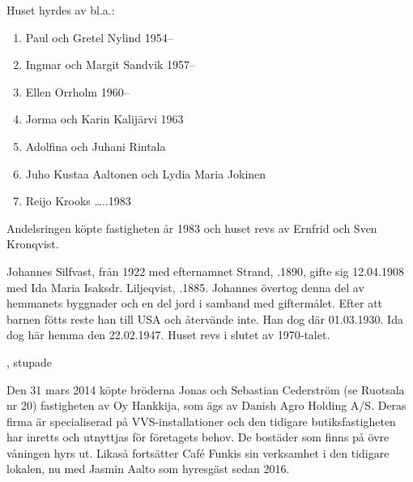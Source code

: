 Huset hyrdes av bl.a.:
\begin{enumerate}
  \item Paul och Gretel Nylind  1954--
  \item Ingmar och Margit Sandvik 1957--
  \item Ellen Orrholm 1960--
  \item Jorma och Karin Kalijärvi 1963
  \item Adolfina och Juhani Rintala
  \item Juho Kustaa Aaltonen och Lydia Maria Jokinen
  \item Reijo Krooks   …..1983
\end{enumerate}
Andelsringen köpte fastigheten år 1983 och huset revs av Ernfrid och Sven Kronqvist.





Johannes Silfvast, från 1922 med efternamnet Strand, .1890, gifte sig 12.04.1908 med Ida Maria Isaksdr. Liljeqvist, .1885. Johannes övertog denna del av hemmanets byggnader och en del jord i samband med giftermålet. Efter att barnen fötts reste han till USA och återvände inte. Han dog där 01.03.1930. Ida dog här hemma den 22.02.1947. Huset revs i slutet av 1970-talet.
\begin{jhchildren}
  \item {}
  \item {}
  \item {}
  \item {}
  \item {}, stupade
  \item {}
\end{jhchildren}




Den 31 mars 2014 köpte bröderna Jonas och Sebastian Cederström (se Ruotsala nr 20) fastigheten av Oy Hankkija, som ägs av Danish Agro Holding A/S. Deras firma är specialiserad på VVS-installationer och den tidigare butiksfastigheten har inretts och utnyttjas för företagets behov. De bostäder som finns på övre våningen hyrs ut. Likaså fortsätter Café Funkis sin verksamhet i den tidigare lokalen, nu med Jasmin Aalto som hyresgäst sedan 2016.


